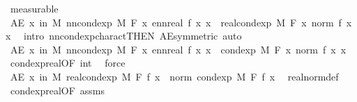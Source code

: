 \begin{isabellebody}
\ measurable\isanewline
\ \ \isamarkupfalse%
\ \isamarkupfalse%
\ {\isachardoublequoteopen}AE\ x\ in\ M{\isachardot}{\kern0pt}\ nn{\isacharunderscore}{\kern0pt}cond{\isacharunderscore}{\kern0pt}exp\ M\ F\ {\isacharparenleft}{\kern0pt}{\isasymlambda}x{\isachardot}{\kern0pt}\ ennreal\ {\isasymbar}f\ x{\isasymbar}{\isacharparenright}{\kern0pt}\ x\ {\isacharequal}{\kern0pt}\ real{\isacharunderscore}{\kern0pt}cond{\isacharunderscore}{\kern0pt}exp\ M\ F\ {\isacharparenleft}{\kern0pt}{\isasymlambda}x{\isachardot}{\kern0pt}\ norm\ {\isacharparenleft}{\kern0pt}f\ x{\isacharparenright}{\kern0pt}{\isacharparenright}{\kern0pt}\ x{\isachardoublequoteclose}\ \isamarkupfalse%
\ {\isacharparenleft}{\kern0pt}intro\ nn{\isacharunderscore}{\kern0pt}cond{\isacharunderscore}{\kern0pt}exp{\isacharunderscore}{\kern0pt}charact{\isacharbrackleft}{\kern0pt}THEN\ AE{\isacharunderscore}{\kern0pt}symmetric{\isacharbrackright}{\kern0pt}{\isacharcomma}{\kern0pt}\ auto{\isacharparenright}{\kern0pt}\isanewline
\ \ \isamarkupfalse%
\ {\isachardoublequoteopen}AE\ x\ in\ M{\isachardot}{\kern0pt}\ nn{\isacharunderscore}{\kern0pt}cond{\isacharunderscore}{\kern0pt}exp\ M\ F\ {\isacharparenleft}{\kern0pt}{\isasymlambda}x{\isachardot}{\kern0pt}\ ennreal\ {\isasymbar}f\ x{\isasymbar}{\isacharparenright}{\kern0pt}\ x\ {\isasymle}\ cond{\isacharunderscore}{\kern0pt}exp\ M\ F\ {\isacharparenleft}{\kern0pt}{\isasymlambda}x{\isachardot}{\kern0pt}\ norm\ {\isacharparenleft}{\kern0pt}f\ x{\isacharparenright}{\kern0pt}{\isacharparenright}{\kern0pt}\ x{\isachardoublequoteclose}\ \isamarkupfalse%
\ cond{\isacharunderscore}{\kern0pt}exp{\isacharunderscore}{\kern0pt}real{\isacharbrackleft}{\kern0pt}OF\ int{\isacharbrackright}{\kern0pt}\ \isamarkupfalse%
\ force\isanewline
\ \ \isamarkupfalse%
\ \isamarkupfalse%
\ {\isachardoublequoteopen}AE\ x\ in\ M{\isachardot}{\kern0pt}\ {\isasymbar}real{\isacharunderscore}{\kern0pt}cond{\isacharunderscore}{\kern0pt}exp\ M\ F\ f\ x{\isasymbar}\ {\isacharequal}{\kern0pt}\ norm\ {\isacharparenleft}{\kern0pt}cond{\isacharunderscore}{\kern0pt}exp\ M\ F\ f\ x{\isacharparenright}{\kern0pt}{\isachardoublequoteclose}\ \isamarkupfalse%
\ real{\isacharunderscore}{\kern0pt}norm{\isacharunderscore}{\kern0pt}def\ \isamarkupfalse%
\ cond{\isacharunderscore}{\kern0pt}exp{\isacharunderscore}{\kern0pt}real{\isacharbrackleft}{\kern0pt}OF\ assms{\isacharbrackright}{\kern0pt}\ {\isacharasterisk}{\kern0pt}\ \isamarkupfalse%

\end{isabellebody}

